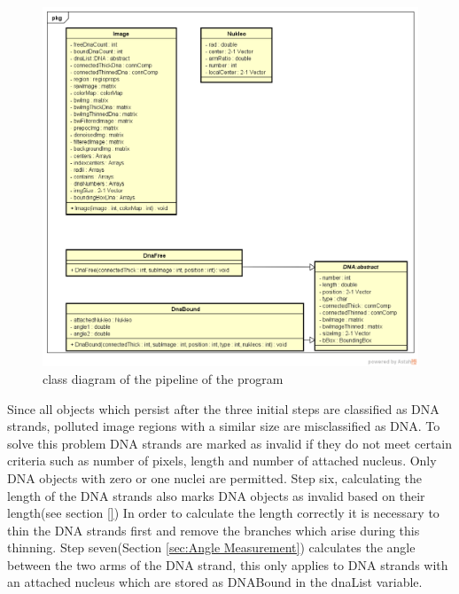 \documentclass{article}
\begin{document}
\begin{figure}[!ht]
	
      \includegraphics[width=1\linewidth]{ClassDiagram.png}
	
	\caption{class diagram of the pipeline of the program} %
	\label{fig:ClassDiagram} %
\end{figure}
Since all objects which persist after the three initial steps are classified as DNA strands, polluted image regions with a similar size are misclassified as DNA.
To solve this problem DNA strands are marked as invalid if they do not meet certain criteria such as number of pixels, length and number of attached nucleus.
Only DNA objects with zero or one nuclei are permitted.
Step six, calculating the length of the DNA strands also marks DNA objects as invalid based on their length(see section \ref{}) %
In order to calculate the length correctly it is necessary to thin the DNA strands first and remove the branches which arise during this thinning.
Step seven(Section \ref{sec:Angle Measurement})  calculates the angle between the two arms of the DNA strand, this only applies to DNA strands with an attached nucleus which are stored as DNABound in the dnaList variable.
\end{document}
